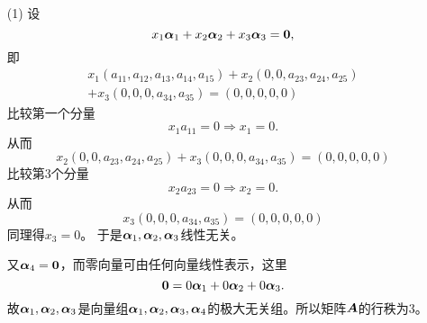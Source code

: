 \begin{frame}[allowframebreaks]
\begin{itemize}
\item[(1)] 设
  $$
  x_1\alphabd_1+x_2\alphabd_2+x_3\alphabd_3=\M0,
  $$
  即
  $$
  \begin{aligned}
  x_1(a_{11},a_{12},a_{13},a_{14},a_{15})+
  x_2(0,0,a_{23},a_{24},a_{25})\\
  +
  x_3(0,0,0,a_{34},a_{35})=(0,0,0,0,0)
  \end{aligned}
  $$  
  比较第一个分量
  $$
  x_1a_{11} = 0 \Rightarrow x_1=0.
  $$  从而
  $$
  x_2(0,0,a_{23},a_{24},a_{25})+
  x_3(0,0,0,a_{34},a_{35})=(0,0,0,0,0)
  $$  
  比较第3个分量
  $$
  x_2a_{23} = 0 \Rightarrow x_2=0.
  $$   从而
  $$
  x_3(0,0,0,a_{34},a_{35})=(0,0,0,0,0)
  $$ 
  同理得$x_3=0$。  于是$\boldsymbol{\alpha}_1,\boldsymbol{\alpha}_2,\boldsymbol{\alpha}_3$线性无关。 
  \vspace{0.1in}

  又$\alphabd_4=\M0$，而零向量可由任何向量线性表示，这里
  $$
  \M0 = 0\alphabd_1+0\alphabd_2+0\alphabd_3.
  $$
  故$\boldsymbol{\alpha}_1,\boldsymbol{\alpha}_2,\boldsymbol{\alpha}_3$是向量组$\boldsymbol{\alpha}_1,\boldsymbol{\alpha}_2,\boldsymbol{\alpha}_3,\boldsymbol{\alpha}_4$的极大无关组。所以矩阵$\boldsymbol{A}$的行秩为3。
\end{itemize}
\end{frame}


